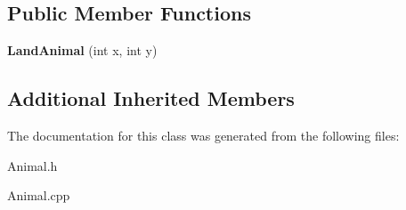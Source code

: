 \subsection*{Public Member Functions}
\begin{DoxyCompactItemize}
\item 
{\bfseries Land\+Animal} (int x, int y)\hypertarget{classLandAnimal_a93384d0797a56eac2e276b8b2f5cd4f1}{}\label{classLandAnimal_a93384d0797a56eac2e276b8b2f5cd4f1}

\end{DoxyCompactItemize}
\subsection*{Additional Inherited Members}


The documentation for this class was generated from the following files\+:\begin{DoxyCompactItemize}
\item 
Animal.\+h\item 
Animal.\+cpp\end{DoxyCompactItemize}
